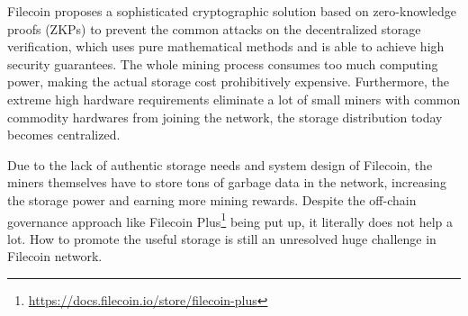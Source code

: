 \documentclass[]{article}
\begin{document}





Filecoin\cite{ref1} proposes a sophisticated cryptographic solution based on zero-knowledge proofs (ZKPs) to prevent the common attacks on the decentralized storage verification, which uses pure mathematical methods and is able to achieve high security guarantees. The whole mining process consumes too much computing power, making the actual storage cost prohibitively expensive. Furthermore, the extreme high hardware requirements eliminate a lot of small miners with common commodity hardwares from joining the network, the storage distribution today becomes centralized.

Due to the lack of authentic storage needs and system design of Filecoin, the miners themselves have to store tons of garbage data in the network, increasing the storage power and earning more mining rewards. Despite the off-chain governance approach like Filecoin Plus\footnote{\url{https://docs.filecoin.io/store/filecoin-plus}} being put up, it literally does not help a lot. How to promote the useful storage is still an unresolved huge challenge in Filecoin network.
\end{document}
